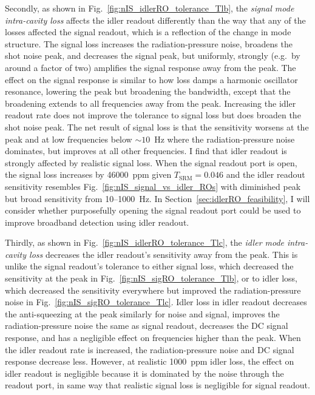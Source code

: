 Secondly, as shown in Fig.~\ref{fig:nIS_idlerRO_tolerance_Tlb}, the \emph{signal mode intra-cavity loss} affects the idler readout differently than the way that any of the losses affected the signal readout, which is a reflection of the change in mode structure. The signal loss increases the radiation-pressure noise, broadens the shot noise peak, and decreases the signal peak, but uniformly, strongly (e.g.\ by around a factor of two) amplifies the signal response away from the peak. The effect on the signal response is similar to how loss damps a harmonic oscillator resonance, lowering the peak but broadening the bandwidth, except that the broadening extends to all frequencies away from the peak. Increasing the idler readout rate does not improve the tolerance to signal loss but does broaden the shot noise peak. The net result of signal loss is that the sensitivity worsens at the peak and at low frequencies below $\sim10$~Hz where the radiation-pressure noise dominates, but improves at all other frequencies. I find that idler readout is strongly affected by realistic signal loss. When the signal readout port is open, the signal loss increases by 46000~ppm given $T_\text{SRM}=0.046$ and the idler readout sensitivity resembles Fig.~\ref{fig:nIS_signal_vs_idler_ROs} with diminished peak but broad sensitivity from 10--1000~Hz. In Section~\ref{sec:idlerRO_feasibility}, I will consider whether purposefully opening the signal readout port could be used to improve broadband detection using idler readout. %

Thirdly, as shown in Fig.~\ref{fig:nIS_idlerRO_tolerance_Tlc}, the \emph{idler mode intra-cavity loss} decreases the idler readout's sensitivity away from the peak. This is unlike the signal readout's tolerance to either signal loss, which decreased the sensitivity at the peak in Fig.~\ref{fig:nIS_sigRO_tolerance_Tlb}, or to idler loss, which decreased the sensitivity everywhere but improved the radiation-pressure noise in Fig.~\ref{fig:nIS_sigRO_tolerance_Tlc}. Idler loss in idler readout decreases the anti-squeezing at the peak similarly for noise and signal, improves the radiation-pressure noise the same as signal readout, decreases the DC signal response, and has a negligible effect on frequencies higher than the peak. When the idler readout rate is increased, the radiation-pressure noise and DC signal response decrease less. However, at realistic 1000~ppm idler loss, the effect on idler readout is negligible because it is dominated by the noise through the readout port, in same way that realistic signal loss is negligible for signal readout.

